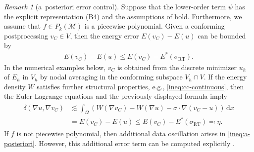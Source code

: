 \documentclass[a4paper]{amsart}
\numberwithin{equation}{section}
\renewcommand{\d}[1]{\,\mathrm{d}#1}
\renewcommand{\div}{\mathrm{div}}
\newcommand{\Mcal}{\mathcal{M}}
\newcommand{\RT}{\mathrm{RT}}
\theoremstyle{remark}
\newtheorem{remark}[theorem]{Remark}
\begin{document}
\begin{remark}[a~posteriori error control]
Suppose that the lower-order term $\psi$ has the explicit representation (B4) and the assumptions of  hold.
	Furthermore, we assume that $f \in P_k(\Mcal)$ is a piecewise polynomial.
	Given a conforming postprocessing $v_C \in V$, then the energy error $E(v_C) - E(u)$ can be bounded by
	\begin{align*}
		E(v_C) - E(u) \leq E(v_C) - E^*(\sigma_\RT).
	\end{align*}
In the numerical examples below, $v_C$ is obtained from the discrete minimizer $u_h$ of $E_h$ in $V_h$ by nodal averaging in the conforming subspace $V_h \cap V$. If the energy density $W$ satisfies further structural properties, e.g., \eqref{ineq:cc-continuous}, then the Euler-Lagrange equations and the previously displayed formula imply
	\begin{align}\label{ineq:a-posteriori}
		\begin{split}
			\delta(\nabla u, \nabla v_C) &\lesssim \int_\Omega (W(\nabla v_C) - W(\nabla u) - \sigma \cdot \nabla (v_C - u)) \d{x}\\
			&= E(v_C) - E(u) \leq E(v_C) - E^*(\sigma_\RT) \eqqcolon \eta.
		\end{split}
	\end{align}
If $f$ is not piecewise polynomial, then additional data oscillation arises in \eqref{ineq:a-posteriori}. However, this additional error term can be computed explicitly \cite[Remark 5.3]{Tran2024}.
\end{remark}
\end{document}
